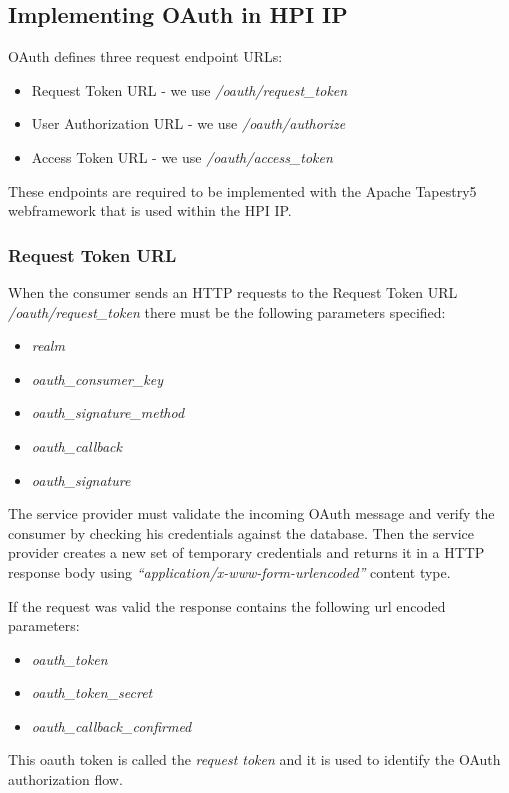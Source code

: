 \subsection{Implementing OAuth in HPI IP}

OAuth defines three request endpoint URLs:

\begin{itemize}
\item
  Request Token URL - we use \emph{/oauth/request\_token}
\item
  User Authorization URL - we use \emph{/oauth/authorize}
\item
  Access Token URL - we use \emph{/oauth/access\_token}
\end{itemize}
These endpoints are required to be implemented with the Apache
Tapestry5 webframework that is used within the HPI IP.

\subsubsection{Request Token URL}

When the consumer sends an HTTP requests to the Request Token URL
\emph{/oauth/request\_token} there must be the following parameters
specified:

\begin{itemize}
\item
  \emph{realm}
\item
  \emph{oauth\_consumer\_key}
\item
  \emph{oauth\_signature\_method}
\item
  \emph{oauth\_callback}
\item
  \emph{oauth\_signature}
\end{itemize}
The service provider must validate the incoming OAuth message and
verify the consumer by checking his credentials against the
database. Then the service provider creates a new set of temporary
credentials and returns it in a HTTP response body using
\emph{``application/x-www-form-urlencoded''} content type.

If the request was valid the response contains the following url
encoded parameters:

\begin{itemize}
\item
  \emph{oauth\_token}
\item
  \emph{oauth\_token\_secret}
\item
  \emph{oauth\_callback\_confirmed}
\end{itemize}
This oauth token is called the \emph{request token} and it is used
to identify the OAuth authorization flow.

